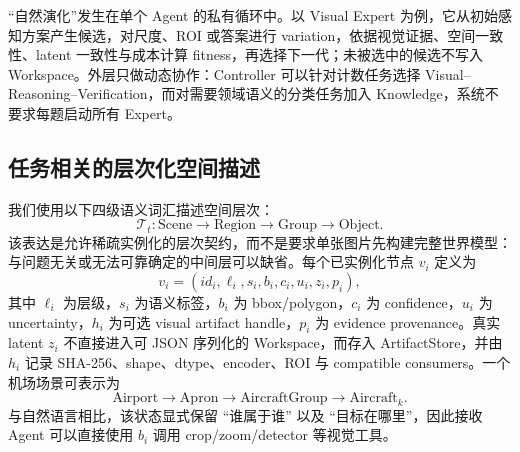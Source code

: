 \documentclass[10pt,a4paper,twocolumn]{ctexart}
\newcommand{\tree}{\mathcal{T}}
\begin{document}
``自然演化''发生在单个 Agent 的私有循环中。以 Visual Expert 为例，它从初始感知方案产生候选，对尺度、ROI 或答案进行 variation，依据视觉证据、空间一致性、latent 一致性与成本计算 fitness，再选择下一代；未被选中的候选不写入 Workspace。外层只做动态协作：Controller 可以针对计数任务选择 Visual--Reasoning--Verification，而对需要领域语义的分类任务加入 Knowledge，系统不要求每题启动所有 Expert。

\subsection{任务相关的层次化空间描述}
我们使用以下四级语义词汇描述空间层次：
\begin{equation}
\tree_t: \mathrm{Scene}\rightarrow\mathrm{Region}\rightarrow\mathrm{Group}\rightarrow\mathrm{Object}.
\end{equation}
该表达是允许稀疏实例化的层次契约，而不是要求单张图片先构建完整世界模型：与问题无关或无法可靠确定的中间层可以缺省。每个已实例化节点 $v_i$ 定义为
\begin{equation}
 v_i=(id_i,\ell_i,s_i,b_i,c_i,u_i,z_i,p_i),
 \label{eq:node}
\end{equation}
其中 $\ell_i$ 为层级，$s_i$ 为语义标签，$b_i$ 为 bbox/polygon，$c_i$ 为 confidence，$u_i$ 为 uncertainty，$h_i$ 为可选 visual artifact handle，$p_i$ 为 evidence provenance。真实 latent $z_i$ 不直接进入可 JSON 序列化的 Workspace，而存入 ArtifactStore，并由 $h_i$ 记录 SHA-256、shape、dtype、encoder、ROI 与 compatible consumers。一个机场场景可表示为
\[
\mathrm{Airport}\rightarrow\mathrm{Apron}\rightarrow\mathrm{AircraftGroup}\rightarrow\mathrm{Aircraft}_k.
\]
与自然语言相比，该状态显式保留 ``谁属于谁'' 以及 ``目标在哪里''，因此接收 Agent 可以直接使用 $b_i$ 调用 crop/zoom/detector 等视觉工具。
\end{document}
